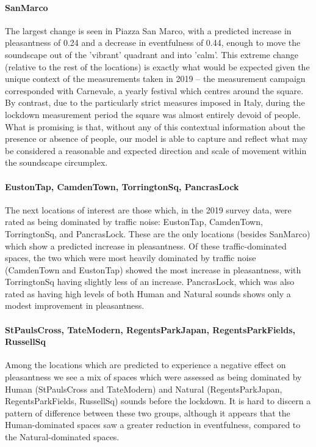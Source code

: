    \paragraph{SanMarco} The largest change is seen in Piazza San Marco, with a predicted increase in pleasantness of 0.24 and a decrease in eventfulness of 0.44, enough to move the soundscape out of the 'vibrant' quadrant and into 'calm'. This extreme change (relative to the rest of the locations) is exactly what would be expected given the unique context of the measurements taken in 2019 -- the measurement campaign corresponded with Carnevale, a yearly festival which centres around the square. By contrast, due to the particularly strict measures imposed in Italy, during the lockdown measurement period the square was almost entirely devoid of people. What is promising is that, without any of this contextual information about the presence or absence of people, our model is able to capture and reflect what may be considered a reasonable and expected direction and scale of movement within the soundscape circumplex.

   \paragraph{EustonTap, CamdenTown, TorringtonSq, PancrasLock} The next locations of interest are those which, in the 2019 survey data, were rated as being dominated by traffic noise: EustonTap, CamdenTown, TorringtonSq, and PancrasLock. These are the only locations (besides SanMarco) which show a predicted increase in pleasantness. Of these traffic-dominated spaces, the two which were most heavily dominated by traffic noise (CamdenTown and EustonTap) showed the most increase in pleasantness, with TorringtonSq having slightly less of an increase. PancrasLock, which was also rated as having high levels of both Human and Natural sounds shows only a modest improvement in pleasantness.

   \paragraph{StPaulsCross, TateModern, RegentsParkJapan, RegentsParkFields, RussellSq} Among the locations which are predicted to experience a negative effect on pleasantness we see a mix of spaces which were assessed as being dominated by Human (StPaulsCross and TateModern) and Natural (RegentsParkJapan, RegentsParkFields, RussellSq) sounds before the lockdown. It is hard to discern a pattern of difference between these two groups, although it appears that the Human-dominated spaces saw a greater reduction in eventfulness, compared to the Natural-dominated spaces.

